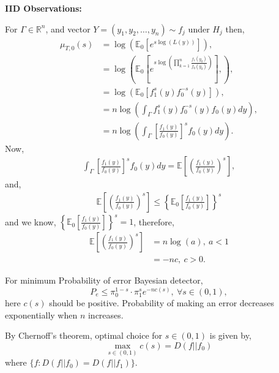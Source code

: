 \documentclass[a4paper,english,12pt]{article}
\begin{document}
\begin{exmp}
\textbf{IID Observations:}
\par For $\Gamma\in \mathbb{R}^n$, and vector $Y=(y_1,y_2,\dots,y_n)\sim f_j$ under $H_j$ then,
\begin{align*}
\mu_{T,0}(s)&=\log\left(\mathbb{E}_0\left[e^{s\log(L(y))}\right]\right),\\
&=\log\left(\mathbb{E}_0\left[e^{s\log\left(\prod_{k=1}^n\frac{f_1(y_k)}{f_0(y_k)}\right)}\right],\right),\\
&=\log\left(\mathbb{E}_0\left[f_1^{s}(y) f_0^{-s}(y)\right]\right),\\
&= n\log\left(\int_{\Gamma}{f_1^{s}(y) f_0^{-s}(y) f_0(y)} dy\right),\\
&= n\log\left(\int_{\Gamma}{\left[\frac{f_1(y)}{f_0(y)}\right]^{s} f_0(y)} dy \right).
\end{align*}
Now,
\begin{align}
\int_{\Gamma}{\left[\frac{f_1(y)}{f_0(y)}\right]^{s} f_0(y)} dy =\mathbb{E}\left[\left(\frac{f_1(y)}{f_0(y)}\right)^s\right],
\end{align}
and,
\begin{align}
\mathbb{E}\left[\left(\frac{f_1(y)}{f_0(y)}\right)^s\right]\leq\left\{\mathbb{E}_0\left[\frac{f_1(y)}{f_0(y)}\right]\right\}^s
\end{align}
and we know, $\left\{\mathbb{E}_0\left[\frac{f_1(y)}{f_0(y)}\right]\right\}^s = 1$, therefore,
\begin{align*}
\mathbb{E}\left[\left(\frac{f_1(y)}{f_0(y)}\right)^s\right] &= n \log(a),~a<1\\
&= -n c,~c>0.
\end{align*}
\end{exmp}
\begin{note}
For minimum Probability of error Bayesian detector,
\begin{equation*}
P_e\leq \pi_0^{1-s}\cdot \pi_1^s e^{-n c(s)},~\forall s\in (0,1),
\end{equation*} 
here $c(s)$ should be positive. Probability of making an error decreases exponentially when $n$ increases.
\end{note}
\begin{note}
By Chernoff's theorem, optimal choice for $s\in(0,1)$ is given by,
\begin{equation*}
\max_{s\in (0,1)}{c(s)}=D(f||f_0)
\end{equation*}
where $\{f:D(f||f_0)=D(f||f_1)\}$.
\end{note}
\end{document}
